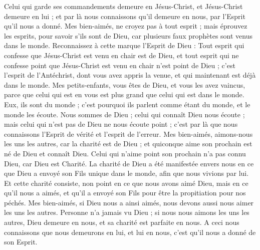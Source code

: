 \begin{multicols}{2}
Celui qui garde ses commandements demeure en Jésus-Christ, et Jésus-Christ demeure en lui ; et par là nous connaissons qu'il demeure en nous, par l'Esprit qu'il nous a donné.
\VerseOne{}Mes bien-aimés, ne croyez pas à tout esprit ; mais éprouvez les esprits, pour savoir s'ils sont de Dieu, car plusieurs faux prophètes sont venus dans le monde.
Reconnaissez à cette marque l'Esprit de Dieu : Tout esprit qui confesse que Jésus-Christ est venu en chair est de Dieu,
et tout esprit qui ne confesse point que Jésus-Christ est venu en chair n'est point de Dieu ; c'est l'esprit de l'Antéchrist, dont vous avez appris la venue, et qui maintenant est déjà dans le monde.
Mes petits-enfants, vous êtes de Dieu, et vous les avez vaincus, parce que celui qui est en vous est plus grand que celui qui est dans le monde.
Eux, ils sont du monde ; c'est pourquoi ils parlent comme étant du monde, et le monde les écoute.
Nous sommes de Dieu ; celui qui connaît Dieu nous écoute ; mais celui qui n'est pas de Dieu ne nous écoute point ; c'est par là que nous connaissons l'Esprit de vérité et l'esprit de l'erreur.
Mes bien-aimés, aimons-nous les uns les autres, car la charité est de Dieu ; et quiconque aime son prochain est né de Dieu et connaît Dieu.
Celui qui n'aime point son prochain n'a pas connu Dieu, car Dieu est Charité.
La charité de Dieu a été manifestée envers nous en ce que Dieu a envoyé son Fils unique dans le monde, afin que nous vivions par lui.
Et cette charité consiste, non point en ce que nous avons aimé Dieu, mais en ce qu'il nous a aimés, et qu'il a envoyé son Fils pour être la propitiation pour nos péchés.
Mes bien-aimés, si Dieu nous a ainsi aimés, nous devons aussi nous aimer les uns les autres.
Personne n'a jamais vu Dieu ; si nous nous aimons les uns les autres, Dieu demeure en nous, et sa charité est parfaite en nous.
A ceci nous connaissons que nous demeurons en lui, et lui en nous, c'est qu'il nous a donné de son Esprit.

\end{multicols}
